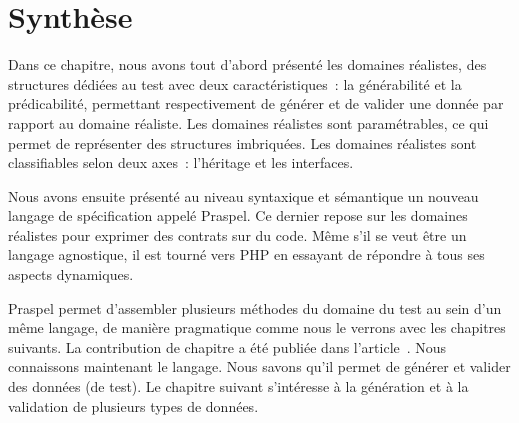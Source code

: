 \section{Synthèse}
\label{section:language:summary}

Dans ce chapitre, nous avons tout d'abord présenté les domaines réalistes, des
structures dédiées au test avec deux caractéristiques~: la générabilité et la
prédicabilité, permettant respectivement de générer et de valider une donnée par
rapport au domaine réaliste. Les domaines réalistes sont paramétrables, ce qui
permet de représenter des structures imbriquées. Les domaines réalistes sont
classifiables selon deux axes~: l'héritage et les interfaces.

Nous avons ensuite présenté au niveau syntaxique et sémantique un nouveau
langage de spécification appelé Praspel. Ce dernier repose sur les domaines
réalistes pour exprimer des contrats sur du code. Même s'il se veut être un
langage agnostique, il est tourné vers PHP en essayant de répondre à tous ses
aspects dynamiques.

Praspel permet d'assembler plusieurs méthodes du domaine du test au sein d'un
même langage, de manière pragmatique comme nous le verrons avec les chapitres
suivants. La contribution de chapitre a été publiée dans
l'article~. Nous connaissons maintenant le langage. Nous
savons qu'il permet de générer et valider des données (de test). Le chapitre
suivant s'intéresse à la génération et à la validation de plusieurs types de
données.
